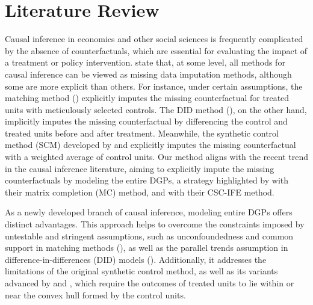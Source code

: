 \documentclass[12pt]{article}
\begin{document}
\section{Literature Review} 
\label{sec: literature}
Causal inference in economics and other social sciences is frequently complicated by the absence of counterfactuals, which are essential for evaluating the impact of a treatment or policy intervention. \cite{imbens2015causal} state that, at some level, all methods for causal inference can be viewed as missing data imputation methods, although some are more explicit than others. For instance, under certain assumptions, the matching method (\cite{abadie2006large, abadie2011bias}) explicitly imputes the missing counterfactual for treated units with meticulously selected controls. The DID method (\cite{card1993minimum, ashenfelter1978estimating}), on the other hand, implicitly imputes the missing counterfactual by differencing the control and treated units before and after treatment. Meanwhile, the synthetic control method (SCM) developed by \cite{abadie2010synthetic} and \cite{abadie2003economic} explicitly imputes the missing counterfactual with a weighted average of control units. Our method aligns with the recent trend in the causal inference literature, aiming to explicitly impute the missing counterfactuals by modeling the entire DGPs, a strategy highlighted by \cite{athey2021matrix} with their matrix completion (MC) method, and \cite{xu2017generalized} with their CSC-IFE method.

As a newly developed branch of causal inference, modeling entire DGPs offers distinct advantages. This approach helps to overcome the constraints imposed by untestable and stringent assumptions, such as unconfoundedness and common support in matching methods (\cite{rosenbaum1983central, rubin1997estimating}), as well as the parallel trends assumption in difference-in-differences (DID) models (\cite{card1993minimum}). Additionally, it addresses the limitations of the original synthetic control method, as well as its variants advanced by \cite{ben2021augmented} and \cite{arkhangelsky2021synthetic}, which require the outcomes of treated units to lie within or near the convex hull formed by the control units.
\end{document}
